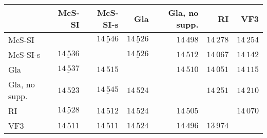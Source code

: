 
\begin{tabular}{lrrrrrr}
    \toprule

 & McS-SI & McS-SI-s & Gla & Gla, no supp. & RI & VF3 \\

    \midrule

\rule{0pt}{2.3ex}McS-SI &  & $\underline{14\,546}$ & $\underline{14\,526}$ & $14\,498$ & $14\,278$ & $14\,254$ \\
\rule{0pt}{2.3ex}McS-SI-s & $\underline{14\,536}$ &  & $\underline{14\,526}$ & $14\,512$ & $14\,067$ & $14\,142$ \\
\rule{0pt}{2.3ex}Gla & $\underline{14\,537}$ & $14\,515$ &  & $14\,510$ & $14\,051$ & $14\,115$ \\
\rule{0pt}{2.3ex}Gla, no supp. & $14\,523$ & $\underline{14\,545}$ & $14\,524$ &  & $14\,251$ & $14\,210$ \\
\rule{0pt}{2.3ex}RI & $\underline{14\,528}$ & $14\,512$ & $14\,524$ & $14\,505$ &  & $14\,070$ \\
\rule{0pt}{2.3ex}VF3 & $14\,511$ & $14\,511$ & $14\,524$ & $14\,496$ & $13\,974$ &  \\

    \bottomrule
\end{tabular}

